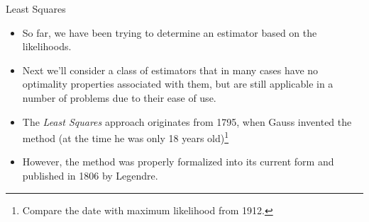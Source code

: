 \documentclass[10pt, aspectratio=169]{beamer} %
\begin{document}
\begin{frame}[allowframebreaks=0.8]
 {Least Squares}
 \begin{itemize}
\item So far, we have been trying to determine an estimator based on the likelihoods.
\item Next we'll consider a class of estimators that in many cases have no optimality 
properties associated with them, but are still applicable in a number of problems
due to their ease of use.
\item The \emph{Least Squares} approach originates from 1795, when Gauss
invented the method (at the time he was only 18 years old)\footnote[frame]{\tiny Compare the date
with maximum likelihood from 1912.\vspace*{0.4cm}}
\item However, the method was properly formalized into its current form and published in 1806 by Legendre.
\end{itemize}
\end{frame}
\end{document}
